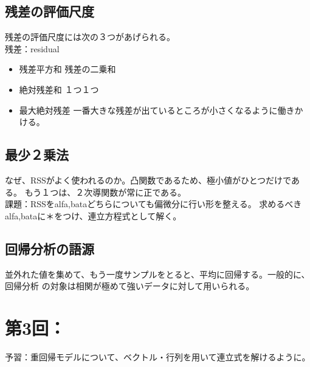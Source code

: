 \documentclass{jsarticle}
\begin{document}
\subsection{残差の評価尺度}
残差の評価尺度には次の３つがあげられる。\\
残差：residual
\begin{itemize}
  \item 残差平方和
  残差の二乗和
  \item 絶対残差和
  １つ１つ
  \item 最大絶対残差
  一番大きな残差が出ているところが小さくなるように働きかける。\\
\end{itemize}

\subsection{最少２乗法}
なぜ、RSSがよく使われるのか。凸関数であるため、極小値がひとつだけである。
もう１つは、２次導関数が常に正である。\\
課題：RSSをalfa,bataどちらについても偏微分に行い形を整える。
求めるべきalfa,bataに＊をつけ、連立方程式として解く。

\subsection{回帰分析の語源}
並外れた値を集めて、もう一度サンプルをとると、平均に回帰する。一般的に、回帰分析
の対象は相関が極めて強いデータに対して用いられる。

\section{第3回：}
予習：重回帰モデルについて、ベクトル・行列を用いて連立式を解けるように。
\end{document}

